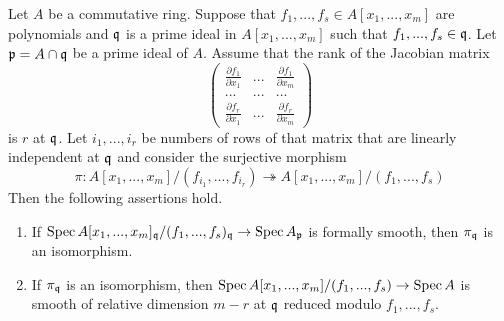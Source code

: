 \begin{proposition}\label{proposition:jacobian_criterion}
Let $A$ be a commutative ring. Suppose that $f_1,...,f_s\in A[x_1,...,x_m]$ are polynomials and $\mathfrak{q}$ is a prime ideal in $A[x_1,...,x_m]$ such that $f_1,...,f_s\in \mathfrak{q}$. Let $\mathfrak{p} = A\cap \mathfrak{q}$ be a prime ideal of $A$. Assume that the rank of the Jacobian matrix
$$\begin{pmatrix}
\frac{\partial f_1}{\partial x_1} & ... & \frac{\partial f_1}{\partial x_{m}} \\
... &...  &...  \\
\frac{\partial f_r}{\partial x_{1}} &...  & \frac{\partial f_r}{\partial x_{m}}\end{pmatrix}$$
is $r$ at $\mathfrak{q}$. Let $i_1,...,i_r$ be numbers of rows of that matrix that are linearly independent at $\mathfrak{q}$ and consider the surjective morphism
$$\pi:A[x_1,...,x_m]/(f_{i_1},...,f_{i_r}) \twoheadrightarrow A[x_1,...,x_m]/(f_1,...,f_s)$$
Then the following assertions hold.
\begin{enumerate}[label=\emph{\textbf{(\arabic*)}}, leftmargin=3.0em]
\item If $\mathrm{Spec}\, A[x_1,...,x_m]_{\mathfrak{q}}/(f_1,...,f_s)_{\mathfrak{q}} \rightarrow \mathrm{Spec}\, A_{\mathfrak{p}}$ is formally smooth, then $\pi_{\mathfrak{q}}$ is an isomorphism.
\item If $\pi_{\mathfrak{q}}$ is an isomorphism, then $\mathrm{Spec}\, A[x_1,...,x_m]/(f_1,...,f_s)\rightarrow \mathrm{Spec}\, A$ is smooth of relative dimension $m-r$ at $\mathfrak{q}$ reduced modulo $f_1,...,f_s$.
\end{enumerate}
\end{proposition}

